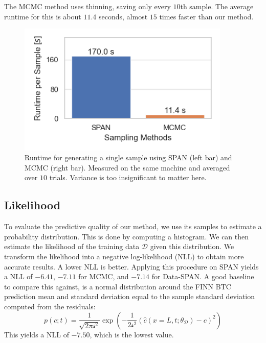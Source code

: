 \documentclass{article}
\begin{document}
The MCMC method uses thinning, saving only every $10$th sample. The average runtime for this is about $11.4$ seconds, almost $15$ times faster than our method.



\begin{figure}
    \centering
    \includegraphics[width=0.9\textwidth]{figs/runtime_per_sample.png}
    \caption{Runtime for generating a single sample using SPAN (left bar) and MCMC (right bar). Measured on the same machine and averaged over $10$ trials. Variance is too insignificant to matter here.}
    \label{fig:runtime_per_sample}
\end{figure}

\subsection{Likelihood}
\label{sec:likelihood}
To evaluate the predictive quality of our method, we use its samples to estimate a probability distribution. This is done by computing a histogram. We can then estimate the likelihood of the training data $\mathcal{D}$ given this distribution. We transform the likelihood into a negative log-likelihood (NLL) to obtain more accurate results. A lower NLL is better. Applying this procedure on SPAN yields a NLL of $-6.41$, $-7.11$ for MCMC, and $-7.14$ for Data-SPAN. A good baseline to compare this against, is a normal distribution around the FINN BTC prediction mean and standard deviation equal to the sample standard deviation computed from the residuals:
\begin{equation*}
    p(c; t) = \frac{1}{\sqrt{2 \pi \mathcal{s}^2}} \exp(-\frac{1}{2 \mathcal{s}^2} (\hat{c}(x=L, t; \theta_{\mathcal{D}}) - c)^2)
\end{equation*}
This yields a NLL of $-7.50$, which is the lowest value. %
\end{document}
